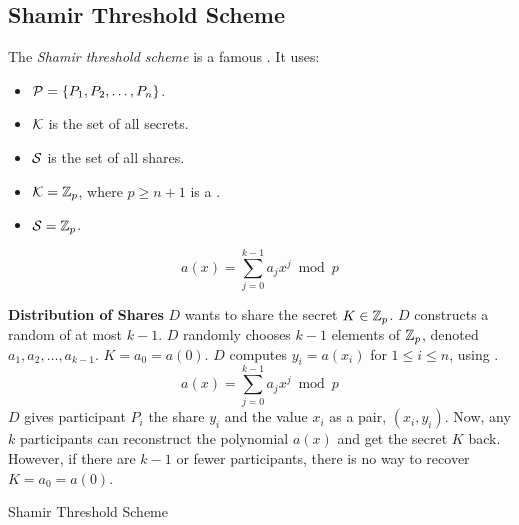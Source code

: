 \subsection{Shamir Threshold Scheme}\label{subsec:Shamir_Threshold_Scheme}
\begin{definition}\label{def:Shamir_Threshold_Scheme}
  The \emph{Shamir threshold scheme} is a famous .
  It uses:
  \begin{itemize}[noitemsep]
  \item $\operatorname{\mathcal{P}} = \lbrace P_{1}, P_{2}, \ldots, P_{n} \rbrace$.
  \item $\operatorname{\mathcal{K}}$ is the set of all secrets.
  \item $\operatorname{\mathcal{S}}$ is the set of all shares.
  \item $\operatorname{\mathcal{K}} = \operatorname{\mathbb{Z}}_{p}$, where $p \geq n + 1$ is a .
  \item $\operatorname{\mathcal{S}} = \operatorname{\mathbb{Z}}_{p}$.
  \end{itemize}

  \begin{equation}\label{eq:Shamir_Threshold_Scheme}
    a(x) = \sum\limits_{j=0}^{k-1} a_{j} x^{j} \bmod p
  \end{equation}

  \begin{algorithm}[H]
    \DontPrintSemicolon{}

    \BlankLine{}

    \textbf{Distribution of Shares} \;
    $D$ wants to share the secret $K \in \operatorname{\mathbb{Z}}_{p}$.
    $D$ constructs a random  of  at most $k-1$.
    $D$ randomly chooses $k-1$ elements of $\operatorname{\mathbb{Z}}_{p}$, denoted $a_{1}, a_{2}, \ldots, a_{k-1}$. \;
    \textbf{$K = a_{0} = a(0)$}.
    \BlankLine{}
    $D$ computes $y_{i} = a(x_{i})$ for $1 \leq i \leq n$, using . \;
    \begin{equation*}
      a(x) = \sum\limits_{j=0}^{k-1} a_{j}x^{j} \bmod p
    \end{equation*} \;
    $D$ gives participant $P_{i}$ the share $y_{i}$ and the value $x_{i}$ as a pair, $(x_{i}, y_{i})$. \;
    \BlankLine{}
    Now, any $k$ participants can reconstruct the polynomial $a(x)$ and get the secret $K$ back. \;
    However, if there are $k-1$ or fewer participants, there is no way to recover $K = a_{0} = a(0)$.
    \caption{Shamir Threshold Scheme}
    \label{algo:Shamir_Threshold_Scheme}
  \end{algorithm}
\end{definition}


